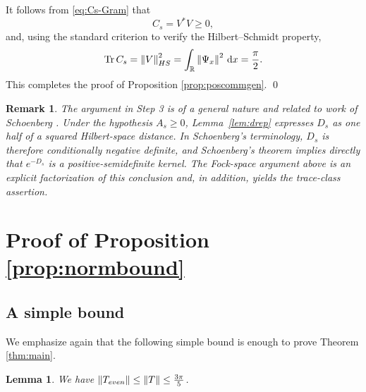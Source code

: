 \documentclass[10pt,a4paper]{amsart}
\newtheorem{lemma}[theorem]{Lemma}
\newtheorem{remark}[theorem]{Remark}
\newcommand{\R}{\mathbb{R}}
\newcommand{\norm}[1]{\left\lVert #1\right\rVert}
\newcommand{\dd}{\,\mathrm{d}}
\begin{document}
It follows from \eqref{eq:Cs-Gram} that
\[
C_s=V^*V\geq0,
\]
and, using the standard criterion to verify the Hilbert--Schmidt property,
\[
\operatorname{Tr}C_s=\norm{V}_{\rm HS}^2=\int_{\R}\norm{\Psi_x}^2\dd x=\frac\pi2.
\]
This completes the proof of Proposition \ref{prop:poscommgen}.
\qed

\begin{remark}
    The argument in Step 3 is of a general nature and related to work of Schoenberg \cite{Schoenberg}. Under the hypothesis $A_s\geq0$, Lemma~\ref{lem:drep} expresses
$D_s$ as one half of a squared Hilbert-space distance.  In
Schoenberg's terminology, $D_s$ is therefore conditionally negative
definite, and Schoenberg's theorem \cite{Schoenberg} implies directly
that $e^{-D_s}$ is a positive-semidefinite kernel.  The Fock-space
argument above is an explicit factorization of this conclusion and,
in addition, yields the trace-class assertion.
\end{remark}



\section{Proof of Proposition \ref{prop:normbound}}\label{sec:normbound}

\subsection{A simple bound}

We emphasize again that the following simple bound is enough to prove Theorem \ref{thm:main}.

\begin{lemma}\label{lem:k-bound}
    We have $\|T_{\rm even}\| \leq \|T\| \leq \frac{3\pi}5$.
\end{lemma}
\end{document}
